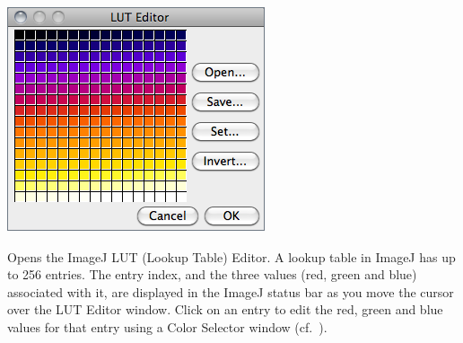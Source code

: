 \begin{minipage}[c][1\totalheight][t]{0.407\columnwidth}%
\includegraphics[scale=0.55]{images/EditLut}%
\end{minipage}%
\begin{minipage}[c][1\totalheight][t]{0.57\columnwidth}%
Opens the ImageJ LUT (Lookup Table) Editor. A lookup table in ImageJ
has up to 256 entries. The entry index, and the three values (red,
green and blue) associated with it, are displayed in the ImageJ status
bar as you move the cursor over the LUT Editor window. Click on an
entry to edit the red, green and blue values for that entry using
a Color Selector window (cf.\ ).


%
\end{minipage}


\subsubsection{\protect{}\label{sub:Color-Picker...[K]}}

